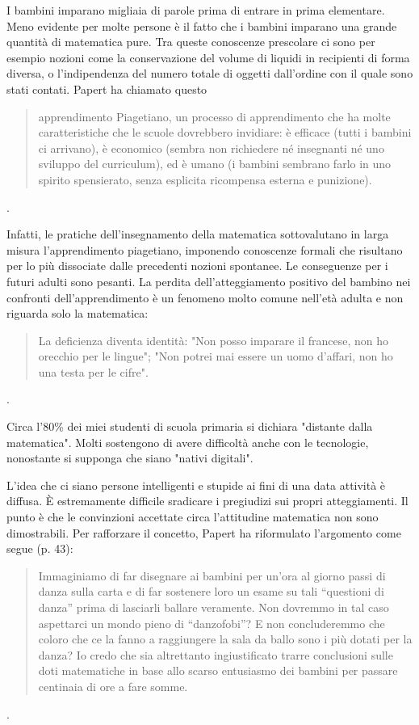 I bambini imparano migliaia di parole prima di entrare in prima elementare. Meno evidente per molte persone è il fatto che i bambini imparano una grande quantità di matematica pure. Tra queste conoscenze prescolare ci sono per esempio nozioni come la conservazione del volume di liquidi in recipienti di forma diversa, o l'indipendenza del numero totale di oggetti dall'ordine con il quale sono stati contati. Papert ha chiamato questo 

\begin{quote}
apprendimento Piagetiano, un processo di apprendimento che ha molte caratteristiche che le scuole dovrebbero invidiare: è efficace (tutti i bambini ci arrivano), è economico (sembra non richiedere né insegnanti né uno sviluppo del curriculum), ed è umano (i bambini sembrano farlo in uno spirito spensierato, senza esplicita ricompensa esterna e punizione).
\end{quote}.  

Infatti, le pratiche dell'insegnamento della matematica sottovalutano in larga misura l'apprendimento piagetiano, imponendo conoscenze formali che risultano per lo più dissociate dalle precedenti nozioni spontanee. Le conseguenze per i futuri adulti sono pesanti. La perdita dell'atteggiamento positivo del bambino nei confronti dell'apprendimento è un fenomeno molto comune nell'età adulta e non riguarda solo la matematica:

\begin{quote}
La deficienza diventa identità: "Non posso imparare il francese, non ho orecchio per le lingue"; "Non potrei mai essere un uomo d'affari, non ho una testa per le cifre".
\end{quote}.  

Circa l'80\% dei miei studenti di scuola primaria si dichiara "distante dalla matematica". Molti sostengono di avere difficoltà anche con le tecnologie, nonostante si supponga che siano "nativi digitali".

L'idea che ci siano persone intelligenti e stupide ai fini di una data attività è diffusa. È estremamente difficile sradicare i pregiudizi sui propri atteggiamenti. Il punto è che le convinzioni accettate circa l'attitudine matematica non sono dimostrabili. Per rafforzare il concetto, Papert ha riformulato l'argomento come segue \cite{Papert} (p. 43):

\begin{quote}
Immaginiamo di far disegnare ai bambini per un'ora al giorno passi di danza sulla carta e di far sostenere loro un esame su tali “questioni di danza” prima di lasciarli ballare veramente. Non dovremmo in tal caso aspettarci un mondo pieno di “danzofobi”? E non concluderemmo che coloro che ce la fanno a raggiungere la sala da ballo sono i più dotati per la danza? Io credo che sia altrettanto ingiustificato trarre conclusioni  sulle doti matematiche in base allo scarso entusiasmo dei bambini per passare centinaia di ore a fare somme.
\end{quote}.

